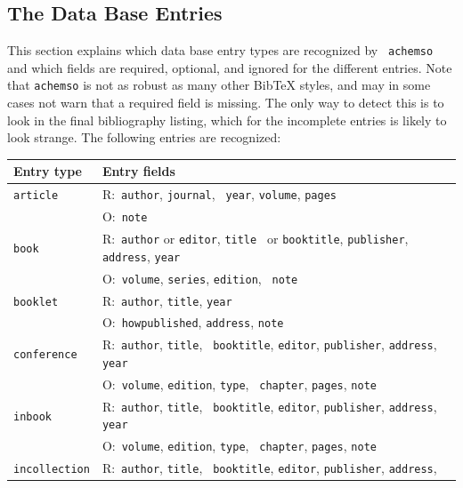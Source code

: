 \documentclass{article}
\begin{document}
\subsection{The Data Base Entries}

This section explains which data base entry types are recognized by \texttt{%
achemso} and which fields are required, optional, and ignored for the
different entries. Note that \texttt{achemso} is not as robust as many other
BibTeX styles, and may in some cases not warn that a required field is
missing. The only way to detect this is to look in the final bibliography
listing, which for the incomplete entries is likely to look strange. The
following entries are recognized:\\[\baselineskip]
\hfill 
\begin{tabular}{|ll|}
\hline
\textbf{Entry type} & \textbf{Entry fields} \\ \hline
\texttt{article} & \textsf{R:}~\texttt{author}, \texttt{journal}, \texttt{%
year}, \texttt{volume}, \texttt{pages} \\ 
& \textsf{O:}~\texttt{note} \\ \hline
\texttt{book} & \textsf{R:}~\texttt{author} or \texttt{editor}, \texttt{title%
} or \texttt{booktitle}, \texttt{publisher}, \texttt{address}, \texttt{year}
\\ 
& \textsf{O:}~\texttt{volume}, \texttt{series}, \texttt{edition}, \texttt{%
note} \\ \hline
\texttt{booklet} & \textsf{R:}~\texttt{author}, \texttt{title}, \texttt{year}
\\ 
& \textsf{O:}~\texttt{howpublished}, \texttt{address}, \texttt{note} \\ 
\hline
\texttt{conference} & \textsf{R:}~\texttt{author}, \texttt{title}, \texttt{%
booktitle}, \texttt{editor}, \texttt{publisher}, \texttt{address}, \texttt{%
year} \\ 
& \textsf{O:}~\texttt{volume}, \texttt{edition}, \texttt{type}, \texttt{%
chapter}, \texttt{pages}, \texttt{note} \\ \hline
\texttt{inbook} & \textsf{R:}~\texttt{author}, \texttt{title}, \texttt{%
booktitle}, \texttt{editor}, \texttt{publisher}, \texttt{address}, \texttt{%
year} \\ 
& \textsf{O:}~\texttt{volume}, \texttt{edition}, \texttt{type}, \texttt{%
chapter}, \texttt{pages}, \texttt{note} \\ \hline
\texttt{incollection} & \textsf{R:}~\texttt{author}, \texttt{title}, \texttt{%
booktitle}, \texttt{editor}, \texttt{publisher}, \texttt{address}, \texttt{%
}
\end{tabular}
\end{document}
